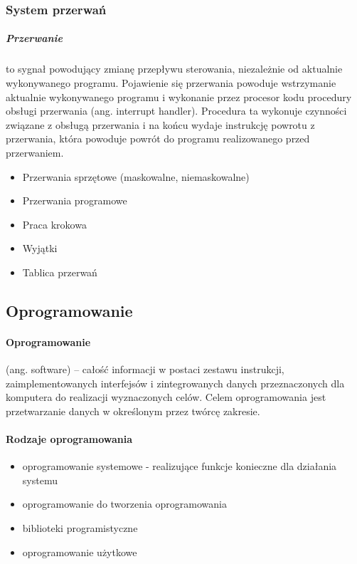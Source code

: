 \documentclass[a4paper,twoside]{report}
\begin{document}
\subsubsection{System przerwań}

\subparagraph{Przerwanie} to sygnał powodujący zmianę przepływu sterowania, niezależnie od aktualnie wykonywanego programu. Pojawienie się przerwania powoduje wstrzymanie aktualnie wykonywanego programu i wykonanie przez procesor kodu procedury obsługi przerwania (ang. interrupt handler). Procedura ta wykonuje czynności związane z obsługą przerwania i na końcu wydaje instrukcję powrotu z przerwania, która powoduje powrót do programu realizowanego przed przerwaniem.
\begin{itemize}
\item Przerwania sprzętowe (maskowalne, niemaskowalne)
\item Przerwania programowe
\item Praca krokowa
\item Wyjątki
\item Tablica przerwań
\end{itemize}

\subsection{Oprogramowanie}

\paragraph{Oprogramowanie} (ang. software) – całość informacji w postaci zestawu instrukcji, zaimplementowanych interfejsów i zintegrowanych danych przeznaczonych dla komputera do realizacji wyznaczonych celów. Celem oprogramowania jest przetwarzanie danych w określonym przez twórcę zakresie.


\paragraph{Rodzaje oprogramowania}

\begin{itemize}
\item oprogramowanie systemowe - realizujące funkcje konieczne dla działania systemu
\item oprogramowanie do tworzenia oprogramowania
\item biblioteki programistyczne 
\item oprogramowanie użytkowe
\end{itemize}
\bigskip
\end{document}
